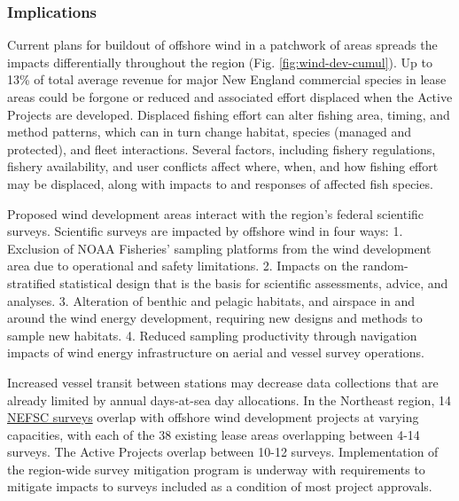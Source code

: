 \documentclass[
  10pt,
]{article}
\begin{document}
\subsubsection{Implications}\label{implications-6}

Current plans for buildout of offshore wind in a patchwork of areas spreads the impacts differentially throughout the region (Fig. \ref{fig:wind-dev-cumul}). Up to 13\% of total average revenue for major New England commercial species in lease areas could be forgone or reduced and associated effort displaced when the Active Projects are developed. Displaced fishing effort can alter fishing area, timing, and method patterns, which can in turn change habitat, species (managed and protected), and fleet interactions. Several factors, including fishery regulations, fishery availability, and user conflicts affect where, when, and how fishing effort may be displaced, along with impacts to and responses of affected fish species.

Proposed wind development areas interact with the region's federal scientific surveys. Scientific surveys are impacted by offshore wind in four ways:
1. Exclusion of NOAA Fisheries' sampling platforms from the wind development area due to operational and safety limitations.
2. Impacts on the random-stratified statistical design that is the basis for scientific assessments, advice, and analyses.
3. Alteration of benthic and pelagic habitats, and airspace in and around the wind energy development, requiring new designs and methods to sample new habitats.
4. Reduced sampling productivity through navigation impacts of wind energy infrastructure on aerial and vessel survey operations.

Increased vessel transit between stations may decrease data collections that are already limited by annual days-at-sea day allocations. In the Northeast region, 14 \href{https://noaa-edab.github.io/catalog/osw_survey_impact.html}{NEFSC surveys} overlap with offshore wind development projects at varying capacities, with each of the 38 existing lease areas overlapping between 4-14 surveys. The Active Projects overlap between 10-12 surveys. Implementation of the region-wide survey mitigation program is underway with requirements to mitigate impacts to surveys included as a condition of most project approvals.
\end{document}
